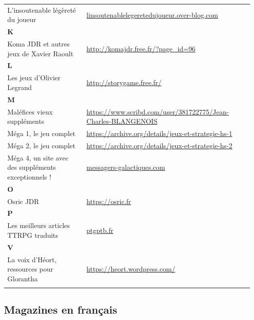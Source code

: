\documentclass[a4paper, 11pt, twoside]{article}
\begin{document}
\begin{longtable}{p{7cm}p{7cm}}
L'insoutenable légèreté du joueur & \href{http://linsoutenablelegeretedujoueur.over-blog.com/}{linsoutenablelegeretedujoueur.over-blog.com}\\
\textbf{K} & \\
Koma JDR et autres jeux de Xavier Raoult & \url{http://komajdr.free.fr/?page\_id=96}\\
\textbf{L} & \\
Les jeux d'Olivier Legrand & \url{http://storygame.free.fr/}\\
\textbf{M} & \\
Maléfices vieux suppléments & \url{https://www.scribd.com/user/381722775/Jean-Charles-BLANGENOIS}\\
Méga 1, le jeu complet & \url{https://archive.org/details/jeux-et-strategie-hs-1}\\
Méga 2, le jeu complet & \url{https://archive.org/details/jeux-et-strategie-hs-2}\\
Méga 4, un site avec des suppléments exceptionnels ! & \href{https://www.messagers-galactiques.com}{messagers-galactiques.com}\\
\textbf{O} & \\
Osric JDR & \url{https://osric.fr}\\
\textbf{P} & \\
Les meilleurs articles TTRPG traduits & \href{https://ptgptb.fr}{ptgptb.fr}\\
\textbf{V} & \\
La voix d'Héort, ressources pour Glorantha & \url{https://heort.wordpress.com/}\\
 & \\
\end{longtable}

\subsection{Magazines en français}
\label{sec:org58b147a}
\end{document}
